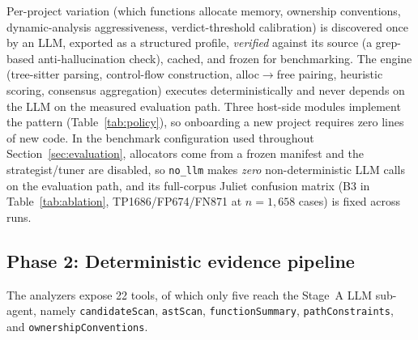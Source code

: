 \documentclass[a4paper]{llncs}
\begin{document}
Per-project variation (which
functions allocate memory, ownership conventions, dynamic-analysis
aggressiveness, verdict-threshold calibration) is discovered once by an
LLM, exported as a structured profile, \emph{verified} against its
source (a grep-based anti-hallucination check), cached, and frozen for
benchmarking. The engine (tree-sitter parsing, control-flow
construction, alloc$\to$free pairing, heuristic scoring, consensus
aggregation) executes deterministically and never depends on the LLM on
the measured evaluation path. Three host-side modules implement the
pattern (Table~\ref{tab:policy}), so onboarding a new project requires
zero lines of new code. In the benchmark configuration used
throughout Section~\ref{sec:evaluation}, allocators come from a frozen
manifest and the strategist/tuner are disabled, so \texttt{no\_llm}
makes \emph{zero} non-deterministic LLM calls on the evaluation path,
and its full-corpus Juliet confusion matrix (B3 in
Table~\ref{tab:ablation}, TP1686/FP674/FN871 at $n{=}1{,}658$ cases) is
fixed across runs.

\begin{table}[htbp]
\centering
\caption{The three POLICY modules and their decisions.}
\label{tab:policy}
\footnotesize
{}
\end{table}

\subsection{Phase 2: Deterministic evidence pipeline}
\label{sec:pipeline}

The analyzers expose 22 tools, of which only five reach the Stage~A LLM
sub-agent, namely \texttt{candidateScan},
\texttt{astScan}, \texttt{functionSummary}, \texttt{pathConstraints},
and \texttt{ownershipConventions}.
\end{document}
